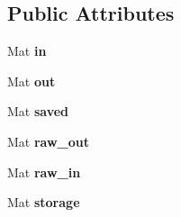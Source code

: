 \subsection*{Public Attributes}
\begin{DoxyCompactItemize}
\item 
Mat {\bfseries in}\hypertarget{classvision_a628e5f4db4cf2b380fa9849b1c7c6ede}{}\label{classvision_a628e5f4db4cf2b380fa9849b1c7c6ede}

\item 
Mat {\bfseries out}\hypertarget{classvision_a8e6f2872c854246898bdaf75db8bc219}{}\label{classvision_a8e6f2872c854246898bdaf75db8bc219}

\item 
Mat {\bfseries saved}\hypertarget{classvision_aaa8cc8d3f4860c2fe40b54d30ba3bb73}{}\label{classvision_aaa8cc8d3f4860c2fe40b54d30ba3bb73}

\item 
Mat {\bfseries raw\+\_\+out}\hypertarget{classvision_ae5f3eff88240c3cb76eb6b6018cc7fea}{}\label{classvision_ae5f3eff88240c3cb76eb6b6018cc7fea}

\item 
Mat {\bfseries raw\+\_\+in}\hypertarget{classvision_a8be17d4889ad9b9154f3d90825893b70}{}\label{classvision_a8be17d4889ad9b9154f3d90825893b70}

\item 
Mat {\bfseries storage}\hypertarget{classvision_adf6eda2658af488a78cbf3d4e9fc9612}{}\label{classvision_adf6eda2658af488a78cbf3d4e9fc9612}

\end{DoxyCompactItemize}
